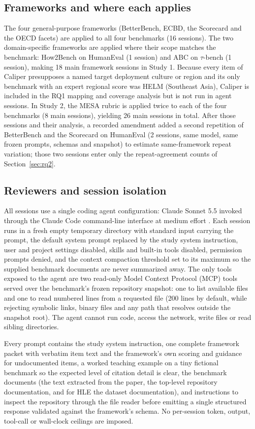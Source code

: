 \documentclass[10pt,conference]{IEEEtran}
\begin{document}
\subsection{Frameworks and where each applies}
The four general-purpose frameworks (BetterBench, ECBD, the Scorecard and the OECD facets) are applied to all four benchmarks (16 sessions). The two domain-specific frameworks are applied where their scope matches the benchmark: How2Bench on HumanEval (1 session) and ABC on $\tau$-bench (1 session), making 18 main framework sessions in Study 1. Because every item of Caliper presupposes a named target deployment culture or region and its only benchmark with an expert regional score was HELM (Southeast Asia), Caliper is included in the RQ1 mapping and coverage analysis but is not run in agent sessions. In Study 2, the MESA rubric is applied twice to each of the four benchmarks (8 main sessions), yielding 26 main sessions in total. After those sessions and their analysis, a recorded amendment added a second repetition of BetterBench and the Scorecard on HumanEval (2 sessions, same model, same frozen prompts, schemas and snapshot) to estimate same-framework repeat variation; those two sessions enter only the repeat-agreement counts of Section~\ref{sec:rq2}.

\subsection{Reviewers and session isolation}
\label{sec:reviewers}
All sessions use a single coding agent configuration: Claude Sonnet 5.5 invoked through the Claude Code command-line interface at medium effort \cite{anthropic_claude_code_cli}. Each session runs in a fresh empty temporary directory with standard input carrying the prompt, the default system prompt replaced by the study system instruction, user and project settings disabled, skills and built-in tools disabled, permission prompts denied, and the context compaction threshold set to its maximum so the supplied benchmark documents are never summarized away. The only tools exposed to the agent are two read-only Model Context Protocol (MCP) tools served over the benchmark's frozen repository snapshot: one to list available files and one to read numbered lines from a requested file (200 lines by default, while rejecting symbolic links, binary files and any path that resolves outside the snapshot root). The agent cannot run code, access the network, write files or read sibling directories.

Every prompt contains the study system instruction, one complete framework packet with verbatim item text and the framework's own scoring and guidance for undocumented items, a worked teaching example on a tiny fictional benchmark so the expected level of citation detail is clear, the benchmark documents (the text extracted from the paper, the top-level repository documentation, and for HLE the dataset documentation), and instructions to inspect the repository through the file reader before emitting a single structured response validated against the framework's schema. No per-session token, output, tool-call or wall-clock ceilings are imposed.
\end{document}
